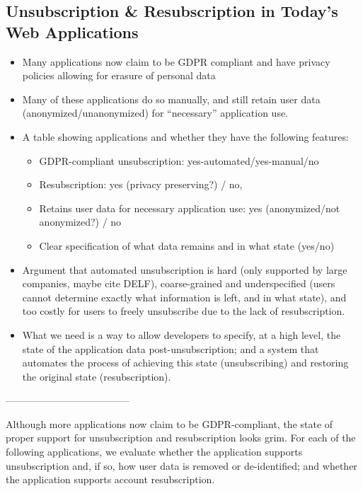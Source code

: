 \subsection{Unsubscription \& Resubscription in Today's Web Applications}
\begin{itemize}
    \item Many applications now claim to be GDPR compliant and have privacy policies allowing for
    erasure of personal data 
    \item Many of these applications do so manually, and still retain user data
    (anonymized/unanonymized) for ``necessary'' application use.
    \item A table showing applications and whether they have the following features: 
    \begin{itemize}
        \item GDPR-compliant unsubscription: yes-automated/yes-manual/no
        \item Resubscription: yes (privacy preserving?) / no, 
        \item Retains user data for necessary application use: yes (anonymized/not anonymized?) / no
        \item Clear specification of what data remains and in what state (yes/no)
    \end{itemize}
    \item Argument that automated unsubscription is hard (only supported by large companies, maybe
    cite DELF), coarse-grained and underspecified (users cannot determine exactly what information
    is left, and in what state), and too costly for users to freely unsubscribe due to the lack of
    resubscription. 
    \item What we need is a way to allow developers to specify, at a high level, the state of the
    application data post-unsubscription; and a system that automates the process of achieving this
    state (unsubscribing) and restoring the original state (resubscription).
\end{itemize}

--------------------------------------

Although more applications now claim to be GDPR-compliant, the state of proper support for
unsubscription and resubscription looks grim. For each of the following applications, we evaluate
whether the application supports unsubscription and, if so, how user data is removed or
de-identified; and whether the application supports account resubscription.

